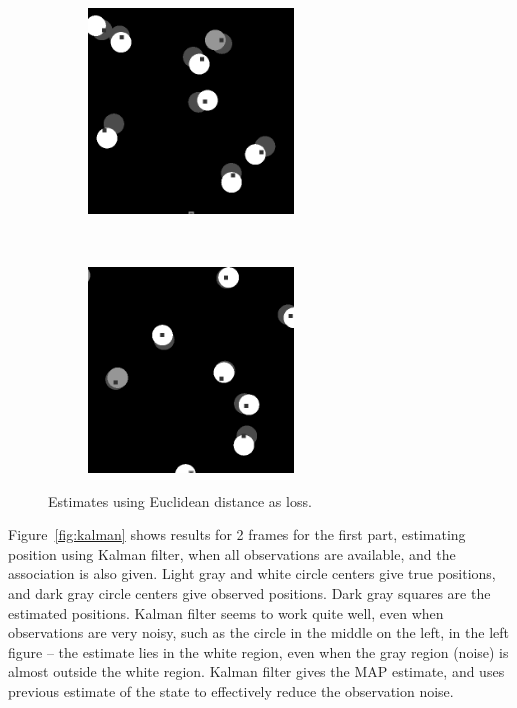 \documentclass[a4paper]{article}
\begin{document}
\begin{figure}[h]
  \centering
  \begin{subfigure}{0.48\textwidth}
  \centering
  \includegraphics[width=0.6\textwidth]{images/nearest_1.png}
  \end{subfigure}~
  \begin{subfigure}{0.48\textwidth}
  \centering
  \includegraphics[width=0.6\textwidth]{images/nearest_2.png}
  \end{subfigure}
  \caption{Estimates using Euclidean distance as loss.}
  \label{fig:nearest}
  \vspace{-2pt}
\end{figure}

Figure~\ref{fig:kalman} shows results for 2 frames for the first part,
estimating position using Kalman filter, when all observations are available,
and the association is also given.
Light gray and white circle centers give true positions, and dark gray circle
centers give observed positions. Dark gray squares are the estimated positions.
Kalman filter seems to work quite well, even when observations are very noisy,
such as the circle in the middle on the left, in the left figure -- the estimate
lies in the white region, even when the gray region (noise) is almost outside
the white region.
Kalman filter gives the MAP estimate, and uses previous estimate of the state
to effectively reduce the observation noise.
\end{document}
